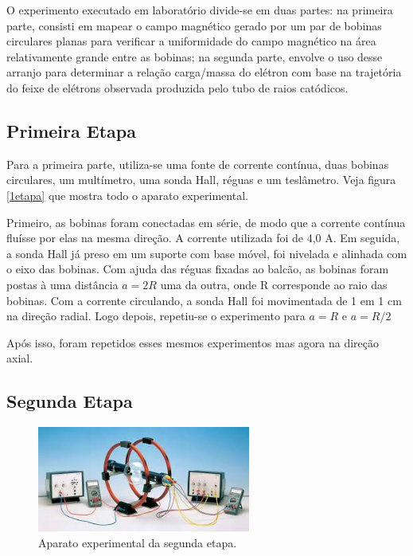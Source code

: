 \documentclass{article}
\begin{document}
O experimento executado em laboratório divide-se em duas partes: na primeira parte, consisti em mapear o campo magnético gerado por um par de bobinas circulares planas para verificar a uniformidade do campo magnético na área relativamente grande entre as bobinas; na segunda parte, envolve o uso desse arranjo para determinar a relação carga/massa do elétron com base na trajetória do feixe de elétrons observada produzida pelo tubo de raios catódicos.

\subsection{Primeira Etapa}

Para a primeira parte, utiliza-se uma fonte de corrente contínua, duas bobinas circulares, um multímetro, uma sonda Hall, réguas e um teslâmetro. Veja figura \ref{1etapa} que mostra todo o aparato experimental.

Primeiro, as bobinas foram conectadas em série, de modo que a corrente contínua fluísse por elas na mesma direção. A corrente utilizada foi de 4,0 A. Em seguida, a sonda Hall já preso em um suporte com base móvel, foi nivelada e alinhada com o eixo das bobinas. Com ajuda das réguas fixadas ao balcão, as bobinas foram postas à uma distância $a = 2R$ uma da outra, onde R corresponde ao raio das bobinas. Com a corrente circulando, a sonda Hall foi movimentada de 1 em 1 cm na direção radial. Logo depois, repetiu-se o experimento para $a=R$ e $a=R/2$

Após isso, foram repetidos esses mesmos experimentos mas agora na direção axial.

\subsection{Segunda Etapa}

\begin{figure}
    \centering
    \includegraphics[width=7cm]{Imagens/Experimento 2.2.png}
    \caption{Aparato experimental da segunda etapa.}
    \label{2etapa}
\end{figure}
\end{document}
